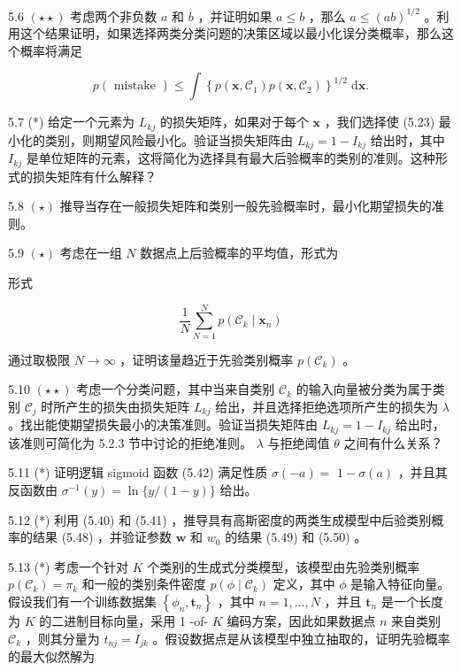 \documentclass[10pt]{article}
\begin{document}
5.6 \(\left( {\star  \star  }\right)\) 考虑两个非负数 \(a\) 和 \(b\) ，并证明如果 \(a \leq  b\) ，那么 \(a \leq  {\left( ab\right) }^{1/2}\) 。利用这个结果证明，如果选择两类分类问题的决策区域以最小化误分类概率，那么这个概率将满足

\[
p\left( \text{ mistake }\right)  \leq  \int {\left\{  p\left( \mathbf{x},{\mathcal{C}}_{1}\right) p\left( \mathbf{x},{\mathcal{C}}_{2}\right) \right\}  }^{1/2}\mathrm{\;d}\mathbf{x}. \tag{5.99}
\]

5.7 (*) 给定一个元素为 \({L}_{kj}\) 的损失矩阵，如果对于每个 \(\mathbf{x}\) ，我们选择使 (5.23) 最小化的类别，则期望风险最小化。验证当损失矩阵由 \({L}_{kj} = 1 - {I}_{kj}\) 给出时，其中 \({I}_{kj}\) 是单位矩阵的元素，这将简化为选择具有最大后验概率的类别的准则。这种形式的损失矩阵有什么解释？

5.8 \(\left( \star \right)\) 推导当存在一般损失矩阵和类别一般先验概率时，最小化期望损失的准则。

5.9 \(\left( \star \right)\) 考虑在一组 \(N\) 数据点上后验概率的平均值，形式为

形式

\[
\frac{1}{N}\mathop{\sum }\limits_{{N = 1}}^{N}p\left( {{\mathcal{C}}_{k} \mid  {\mathbf{x}}_{n}}\right)  \tag{5.100}
\]

通过取极限 \(N \rightarrow  \infty\) ，证明该量趋近于先验类别概率 \(p\left( {\mathcal{C}}_{k}\right)\) 。

5.10 \(\left( {\star  \star  }\right)\) 考虑一个分类问题，其中当来自类别 \({\mathcal{C}}_{k}\) 的输入向量被分类为属于类别 \({\mathcal{C}}_{j}\) 时所产生的损失由损失矩阵 \({L}_{kj}\) 给出，并且选择拒绝选项所产生的损失为 \(\lambda\) 。找出能使期望损失最小的决策准则。验证当损失矩阵由 \({L}_{kj} = 1 - {I}_{kj}\) 给出时，该准则可简化为 5.2.3 节中讨论的拒绝准则。 \(\lambda\) 与拒绝阈值 \(\theta\) 之间有什么关系？

5.11 (*) 证明逻辑 sigmoid 函数 (5.42) 满足性质 \(\sigma \left( {-a}\right)  =\)  \(1 - \sigma \left( a\right)\) ，并且其反函数由 \({\sigma }^{-1}\left( y\right)  = \ln \{ y/\left( {1 - y}\right) \}\) 给出。

5.12 (*) 利用 (5.40) 和 (5.41) ，推导具有高斯密度的两类生成模型中后验类别概率的结果 (5.48) ，并验证参数 \(\mathbf{w}\) 和 \({w}_{0}\) 的结果 (5.49) 和 (5.50) 。

5.13 (*) 考虑一个针对 \(K\) 个类别的生成式分类模型，该模型由先验类别概率 \(p\left( {\mathcal{C}}_{k}\right)  = {\pi }_{k}\) 和一般的类别条件密度 \(p\left( {\phi  \mid  {\mathcal{C}}_{k}}\right)\) 定义，其中 \(\phi\) 是输入特征向量。假设我们有一个训练数据集 \(\left\{  {{\phi }_{n},{\mathbf{t}}_{n}}\right\}\) ，其中 \(n = 1,\ldots ,N\) ，并且 \({\mathbf{t}}_{n}\) 是一个长度为 \(K\) 的二进制目标向量，采用 1 -of- \(K\) 编码方案，因此如果数据点 \(n\) 来自类别 \({\mathcal{C}}_{k}\) ，则其分量为 \({t}_{nj} = {I}_{jk}\) 。假设数据点是从该模型中独立抽取的，证明先验概率的最大似然解为
\end{document}
